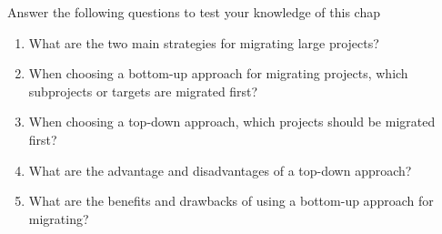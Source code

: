 Answer the following questions to test your knowledge of this chap

\begin{enumerate}
\item 
What are the two main strategies for migrating large projects?

\item 
When choosing a bottom-up approach for migrating projects, which subprojects or targets are migrated first?

\item 
When choosing a top-down approach, which projects should be migrated first?

\item 
What are the advantage and disadvantages of a top-down approach?

\item 
What are the benefits and drawbacks of using a bottom-up approach for migrating?
\end{enumerate}